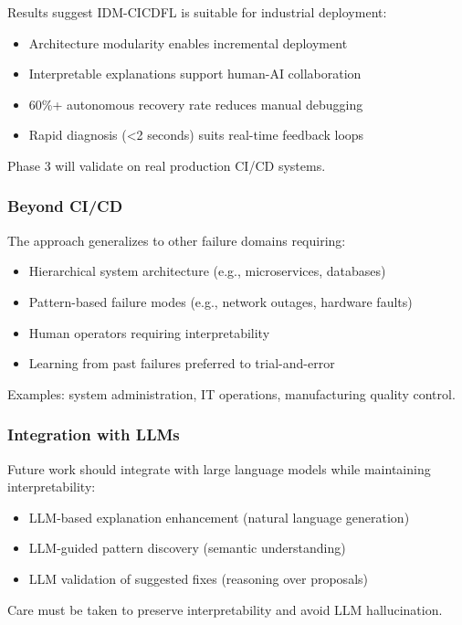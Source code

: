 \documentclass[11pt]{article}
\begin{document}
Results suggest IDM-CICDFL is suitable for industrial deployment:

\begin{itemize}
    \item Architecture modularity enables incremental deployment
    \item Interpretable explanations support human-AI collaboration
    \item 60\%+ autonomous recovery rate reduces manual debugging
    \item Rapid diagnosis (<2 seconds) suits real-time feedback loops
\end{itemize}

Phase 3 will validate on real production CI/CD systems.

\subsubsection{Beyond CI/CD}

The approach generalizes to other failure domains requiring:
\begin{itemize}
    \item Hierarchical system architecture (e.g., microservices, databases)
    \item Pattern-based failure modes (e.g., network outages, hardware faults)
    \item Human operators requiring interpretability
    \item Learning from past failures preferred to trial-and-error
\end{itemize}

Examples: system administration, IT operations, manufacturing quality control.

\subsubsection{Integration with LLMs}

Future work should integrate with large language models while maintaining interpretability:
\begin{itemize}
    \item LLM-based explanation enhancement (natural language generation)
    \item LLM-guided pattern discovery (semantic understanding)
    \item LLM validation of suggested fixes (reasoning over proposals)
\end{itemize}

Care must be taken to preserve interpretability and avoid LLM hallucination.
\end{document}
